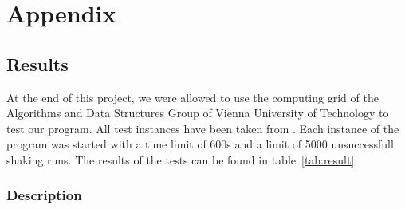 \documentclass[paper=a4,fontsize=12pt]{scrartcl}
\let\origappendix\appendix
\renewcommand\appendix{\clearpage\pagenumbering{roman}\origappendix}
\begin{document}

\appendix

\section{Appendix}

\subsection{Results}

At the end of this project, we were allowed to use the computing grid of the Algorithms and Data Structures Group of Vienna University of Technology to test our program. All test instances have been taken from \cite{Noronha2006}. Each instance of the program was started with a time limit of 600s and a limit of 5000 unsuccessfull shaking runs. The results of the tests can be found in table~\ref{tab:result}.





\subsubsection*{Description}
\end{document}
